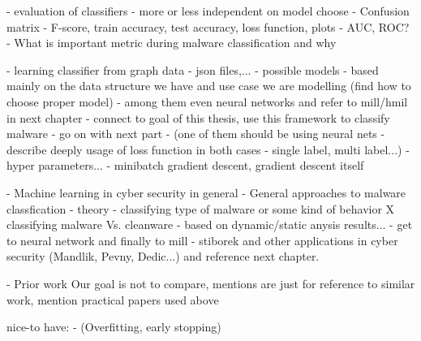 - evaluation of classifiers - more or less independent on model choose
  - Confusion matrix
  - F-score, train accuracy, test accuracy, loss function, plots
        - AUC, ROC?
  - What is important metric during malware classification and why


- learning classifier from graph data - json files,...
- possible models - based mainly on the data structure we have and use case we are modelling (find how to choose proper model)
    - among them even neural networks and refer to mill/hmil in next chapter - connect to goal of this thesis, use this framework to classify malware - go on with next part
- (one of them should be using neural nets - describe deeply usage of loss function in both cases - single label, multi label...)
- hyper parameters...
- minibatch gradient descent, gradient descent itself

- Machine learning in cyber security in general
- General approaches to malware classfication - theory
    - classifying type of malware or some kind of behavior X classifying malware Vs. cleanware
    - based on dynamic/static anysis results...
    - get to neural network and finally to mill - stiborek and other applications in cyber security (Mandlik, Pevny, Dedic...) and reference next chapter.


- Prior work
Our goal is not to compare, mentions are just for reference to similar work, mention practical papers used above

nice-to have:
- (Overfitting, early stopping)



